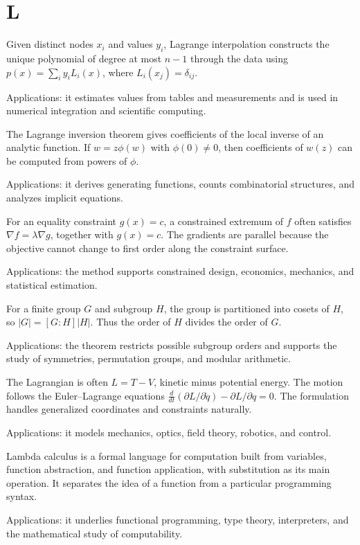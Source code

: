 \chapter*{L}
\label{chap:l}

Given distinct nodes $x_i$ and values $y_i$, Lagrange interpolation constructs the unique polynomial of degree at most $n-1$ through the data using $p(x)=\sum_i y_iL_i(x)$, where $L_i(x_j)=\delta_{ij}$. \par\noindent Applications: it estimates values from tables and measurements and is used in numerical integration and scientific computing.

The Lagrange inversion theorem gives coefficients of the local inverse of an analytic function. If $w=z\phi(w)$ with $\phi(0)\ne0$, then coefficients of $w(z)$ can be computed from powers of $\phi$. \par\noindent Applications: it derives generating functions, counts combinatorial structures, and analyzes implicit equations.

For an equality constraint $g(x)=c$, a constrained extremum of $f$ often satisfies $\nabla f=\lambda\nabla g$, together with $g(x)=c$. The gradients are parallel because the objective cannot change to first order along the constraint surface. \par\noindent Applications: the method supports constrained design, economics, mechanics, and statistical estimation.

For a finite group $G$ and subgroup $H$, the group is partitioned into cosets of $H$, so $|G|=[G:H]|H|$. Thus the order of $H$ divides the order of $G$. \par\noindent Applications: the theorem restricts possible subgroup orders and supports the study of symmetries, permutation groups, and modular arithmetic.

The Lagrangian is often $L=T-V$, kinetic minus potential energy. The motion follows the Euler--Lagrange equations $\frac d{dt}(\partial L/\partial\dot q)-\partial L/\partial q=0$. The formulation handles generalized coordinates and constraints naturally. \par\noindent Applications: it models mechanics, optics, field theory, robotics, and control.

Lambda calculus is a formal language for computation built from variables, function abstraction, and function application, with substitution as its main operation. It separates the idea of a function from a particular programming syntax. \par\noindent Applications: it underlies functional programming, type theory, interpreters, and the mathematical study of computability.

